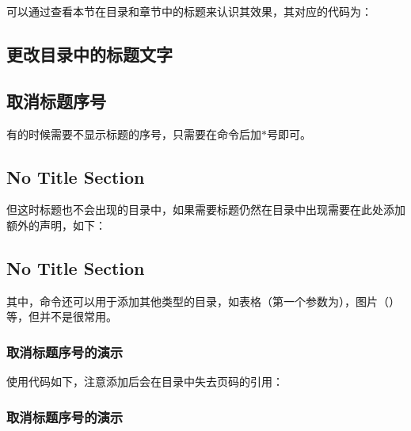     可以通过查看本节在目录和章节中的标题来认识其效果，其对应的代码为：
    \begin{texcode}
        \subsection[更改目录标题]{更改目录中的标题文字}
    \end{texcode}

    \subsection{取消标题序号}
    有的时候需要不显示标题的序号，只需要在命令后加$*$号即可。
    \begin{texcode}
        \section*{No Title Section}
    \end{texcode}

    但这时标题也不会出现的目录中，如果需要标题仍然在目录中出现需要在此处添加额外的声明，如下：
    \begin{texcode}
        \section*{No Title Section} 
    \end{texcode}
    其中，命令还可以用于添加其他类型的目录，如表格（第一个参数为），图片（）等，但并不是很常用。

    \subsubsection*{取消标题序号的演示} 
    使用代码如下，注意添加后会在目录中失去页码的引用：
    \begin{texcode}
        
        \subsubsection*{取消标题序号的演示}
    \end{texcode}
